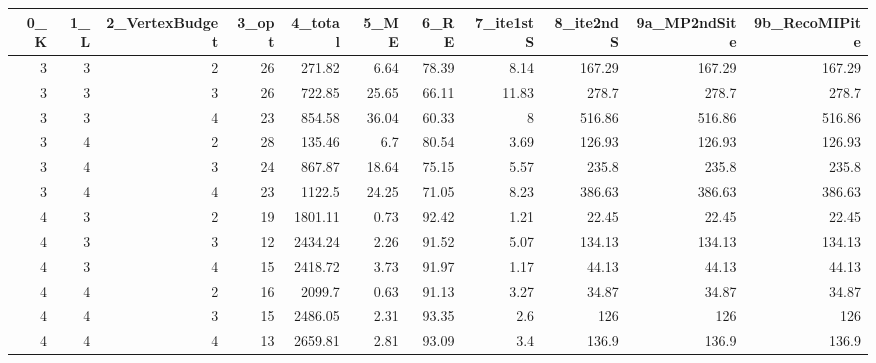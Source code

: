 \begin{tabular}{rrrrrrrrrrr}
\hline
   0\_K &   1\_L &   2\_VertexBudget &   3\_opt &   4\_total &   5\_ME &   6\_RE &   7\_ite1stS &   8\_ite2ndS &   9a\_MP2ndSite &   9b\_RecoMIPite \\
\hline
     3 &     3 &                2 &      26 &    271.82 &   6.64 &  78.39 &        8.14 &      167.29 &         167.29 &          167.29 \\
     3 &     3 &                3 &      26 &    722.85 &  25.65 &  66.11 &       11.83 &      278.7  &         278.7  &          278.7  \\
     3 &     3 &                4 &      23 &    854.58 &  36.04 &  60.33 &        8    &      516.86 &         516.86 &          516.86 \\
     3 &     4 &                2 &      28 &    135.46 &   6.7  &  80.54 &        3.69 &      126.93 &         126.93 &          126.93 \\
     3 &     4 &                3 &      24 &    867.87 &  18.64 &  75.15 &        5.57 &      235.8  &         235.8  &          235.8  \\
     3 &     4 &                4 &      23 &   1122.5  &  24.25 &  71.05 &        8.23 &      386.63 &         386.63 &          386.63 \\
     4 &     3 &                2 &      19 &   1801.11 &   0.73 &  92.42 &        1.21 &       22.45 &          22.45 &           22.45 \\
     4 &     3 &                3 &      12 &   2434.24 &   2.26 &  91.52 &        5.07 &      134.13 &         134.13 &          134.13 \\
     4 &     3 &                4 &      15 &   2418.72 &   3.73 &  91.97 &        1.17 &       44.13 &          44.13 &           44.13 \\
     4 &     4 &                2 &      16 &   2099.7  &   0.63 &  91.13 &        3.27 &       34.87 &          34.87 &           34.87 \\
     4 &     4 &                3 &      15 &   2486.05 &   2.31 &  93.35 &        2.6  &      126    &         126    &          126    \\
     4 &     4 &                4 &      13 &   2659.81 &   2.81 &  93.09 &        3.4  &      136.9  &         136.9  &          136.9  \\
\hline
\end{tabular}